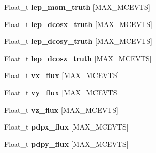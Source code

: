 \begin{DoxyCompactItemize}
\item 
\hypertarget{classanatree_ad0c65927d1d2394169f697951e577a81}{Float\-\_\-t {\bfseries lep\-\_\-mom\-\_\-truth} \mbox{[}M\-A\-X\-\_\-\-M\-C\-E\-V\-T\-S\mbox{]}}\label{classanatree_ad0c65927d1d2394169f697951e577a81}

\item 
\hypertarget{classanatree_a9f652a26bd53c5f3fc4098b925f48e6a}{Float\-\_\-t {\bfseries lep\-\_\-dcosx\-\_\-truth} \mbox{[}M\-A\-X\-\_\-\-M\-C\-E\-V\-T\-S\mbox{]}}\label{classanatree_a9f652a26bd53c5f3fc4098b925f48e6a}

\item 
\hypertarget{classanatree_a9ec3a08061b53451eb18d4f6e04e821c}{Float\-\_\-t {\bfseries lep\-\_\-dcosy\-\_\-truth} \mbox{[}M\-A\-X\-\_\-\-M\-C\-E\-V\-T\-S\mbox{]}}\label{classanatree_a9ec3a08061b53451eb18d4f6e04e821c}

\item 
\hypertarget{classanatree_af623534349e69b1270d729910f462747}{Float\-\_\-t {\bfseries lep\-\_\-dcosz\-\_\-truth} \mbox{[}M\-A\-X\-\_\-\-M\-C\-E\-V\-T\-S\mbox{]}}\label{classanatree_af623534349e69b1270d729910f462747}

\item 
\hypertarget{classanatree_ae06d8566645bb158bccebe8931c97461}{Float\-\_\-t {\bfseries vx\-\_\-flux} \mbox{[}M\-A\-X\-\_\-\-M\-C\-E\-V\-T\-S\mbox{]}}\label{classanatree_ae06d8566645bb158bccebe8931c97461}

\item 
\hypertarget{classanatree_a8137a3d90cbd43804c7932bae6782c1a}{Float\-\_\-t {\bfseries vy\-\_\-flux} \mbox{[}M\-A\-X\-\_\-\-M\-C\-E\-V\-T\-S\mbox{]}}\label{classanatree_a8137a3d90cbd43804c7932bae6782c1a}

\item 
\hypertarget{classanatree_a44a50902a5ebb413ff78051c06b2b0df}{Float\-\_\-t {\bfseries vz\-\_\-flux} \mbox{[}M\-A\-X\-\_\-\-M\-C\-E\-V\-T\-S\mbox{]}}\label{classanatree_a44a50902a5ebb413ff78051c06b2b0df}

\item 
\hypertarget{classanatree_ac4819664ee9e01c58ee2f33a4d779e9e}{Float\-\_\-t {\bfseries pdpx\-\_\-flux} \mbox{[}M\-A\-X\-\_\-\-M\-C\-E\-V\-T\-S\mbox{]}}\label{classanatree_ac4819664ee9e01c58ee2f33a4d779e9e}

\item 
\hypertarget{classanatree_a952a9dd3adff070321dc9fbf2e310177}{Float\-\_\-t {\bfseries pdpy\-\_\-flux} \mbox{[}M\-A\-X\-\_\-\-M\-C\-E\-V\-T\-S\mbox{]}}\label{classanatree_a952a9dd3adff070321dc9fbf2e310177}


\end{DoxyCompactItemize}
